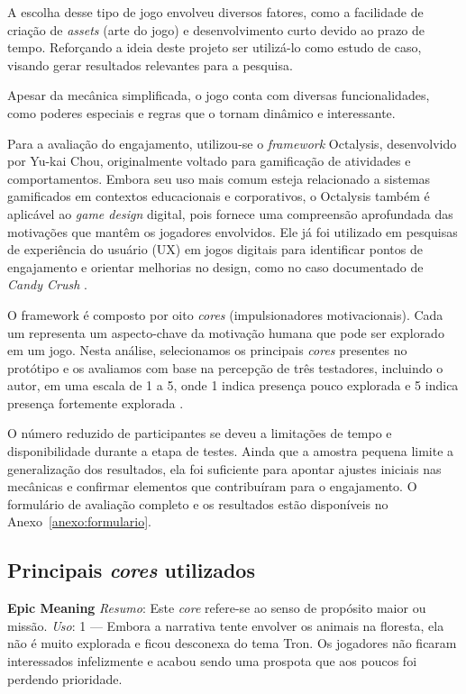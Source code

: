 A escolha desse tipo de jogo envolveu diversos fatores, como a facilidade de criação de \textit{assets} (arte do jogo) e desenvolvimento curto devido ao prazo de tempo. Reforçando a ideia deste projeto ser utilizá-lo como estudo de caso, visando gerar resultados relevantes para a pesquisa.

Apesar da mecânica simplificada, o jogo conta com diversas funcionalidades, como poderes especiais e regras que o tornam dinâmico e interessante.

Para a avaliação do engajamento, utilizou-se o \textit{framework} Octalysis, desenvolvido por Yu-kai Chou, originalmente voltado para gamificação de atividades e comportamentos. Embora seu uso mais comum esteja relacionado a sistemas gamificados em contextos educacionais e corporativos, o Octalysis também é aplicável ao \textit{game design} digital, pois fornece uma compreensão aprofundada das motivações que mantêm os jogadores envolvidos. Ele já foi utilizado em pesquisas de experiência do usuário (UX) em jogos digitais para identificar pontos de engajamento e orientar melhorias no design, como no caso documentado de \textit{Candy Crush} \cite{gamedeveloper2021octalysis}.

O framework é composto por oito \textit{cores} (impulsionadores motivacionais). Cada um representa um aspecto-chave da motivação humana que pode ser explorado em um jogo. Nesta análise, selecionamos os principais \textit{cores} presentes no protótipo e os avaliamos com base na percepção de três testadores, incluindo o autor, em uma escala de 1 a 5, onde 1 indica presença pouco explorada e 5 indica presença fortemente explorada \cite{octalysis}.

O número reduzido de participantes se deveu a limitações de tempo e disponibilidade durante a etapa de testes. Ainda que a amostra pequena limite a generalização dos resultados, ela foi suficiente para apontar ajustes iniciais nas mecânicas e confirmar elementos que contribuíram para o engajamento. O formulário de avaliação completo e os resultados estão disponíveis no Anexo~\ref{anexo:formulario}.

\subsection*{Principais \textit{cores} utilizados}

\textbf{Epic Meaning}
\textit{Resumo}: Este \textit{core} refere-se ao senso de propósito maior ou missão.
\textit{Uso}: 1 — Embora a narrativa tente envolver os animais na floresta, ela não é muito explorada e ficou desconexa do tema Tron. Os jogadores não ficaram interessados infelizmente e acabou sendo uma prospota que aos poucos foi perdendo prioridade.

